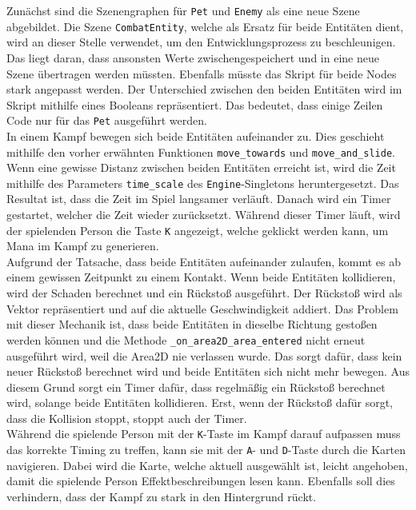 Zunächst sind die Szenengraphen für \texttt{Pet} und \texttt{Enemy} als eine neue Szene abgebildet. Die Szene \texttt{CombatEntity}, welche als Ersatz für beide Entitäten dient, wird an dieser Stelle verwendet, um den Entwicklungsprozess zu beschleunigen. Das liegt daran, dass ansonsten Werte zwischengespeichert und in eine neue Szene übertragen werden müssten. Ebenfalls müsste das Skript für beide Nodes stark angepasst werden. Der Unterschied zwischen den beiden Entitäten wird im Skript mithilfe eines Booleans repräsentiert. Das bedeutet, dass einige Zeilen Code nur für das \texttt{Pet} ausgeführt werden.\\

In einem Kampf bewegen sich beide Entitäten aufeinander zu. Dies geschieht mithilfe den vorher erwähnten Funktionen \texttt{move\_towards} und \texttt{move\_and\_slide}. Wenn eine gewisse Distanz zwischen beiden Entitäten erreicht ist, wird die Zeit mithilfe des Parameters \texttt{time\_scale} des \texttt{Engine}-Singletons heruntergesetzt\cite{godot-class-engine}. Das Resultat ist, dass die Zeit im Spiel langsamer verläuft. Danach wird ein Timer gestartet, welcher die Zeit wieder zurücksetzt. Während dieser Timer läuft, wird der spielenden Person die Taste \texttt{K} angezeigt, welche geklickt werden kann, um Mana im Kampf zu generieren. \\

Aufgrund der Tatsache, dass beide Entitäten aufeinander zulaufen, kommt es ab einem gewissen Zeitpunkt zu einem Kontakt. Wenn beide Entitäten kollidieren, wird der Schaden berechnet und ein Rückstoß ausgeführt. Der Rückstoß wird als Vektor repräsentiert und auf die aktuelle Geschwindigkeit addiert. Das Problem mit dieser Mechanik ist, dass beide Entitäten in dieselbe Richtung gestoßen werden können und die Methode \texttt{\_on\_area2D\_area\_entered} nicht erneut ausgeführt wird, weil die Area2D nie verlassen wurde. Das sorgt dafür, dass kein neuer Rückstoß berechnet wird und beide Entitäten sich nicht mehr bewegen. Aus diesem Grund sorgt ein Timer dafür, dass regelmäßig ein Rückstoß berechnet wird, solange beide Entitäten kollidieren. Erst, wenn der Rückstoß dafür sorgt, dass die Kollision stoppt, stoppt auch der Timer.\\

Während die spielende Person mit der \texttt{K}-Taste im Kampf darauf aufpassen muss das korrekte Timing zu treffen, kann sie mit der \texttt{A}- und \texttt{D}-Taste durch die Karten navigieren. Dabei wird die Karte, welche aktuell ausgewählt ist, leicht angehoben, damit die spielende Person Effektbeschreibungen lesen kann. Ebenfalls soll dies verhindern, dass der Kampf zu stark in den Hintergrund rückt. \\

